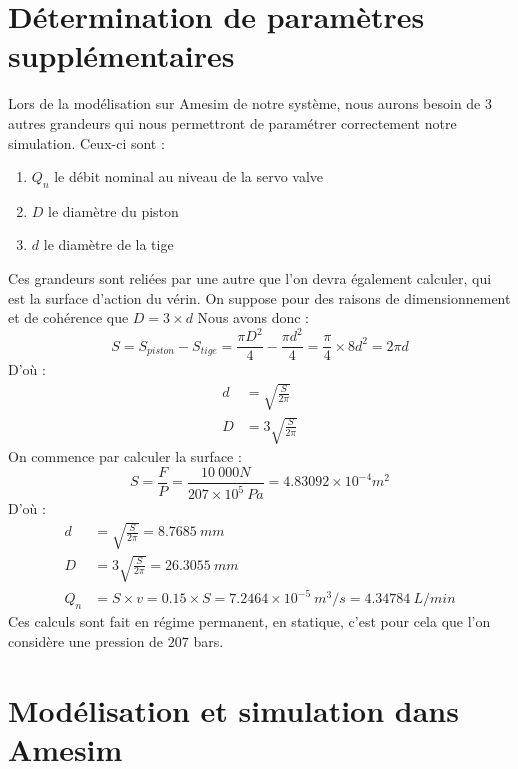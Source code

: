\documentclass[a4paper,12pt,calibri,oneside,openany]{book}
\theoremstyle{break}
\begin{document}
\section{Détermination de paramètres supplémentaires}
\qquad Lors de la modélisation sur Amesim de notre système, nous aurons besoin de $3$ autres grandeurs qui nous permettront de paramétrer correctement notre simulation. Ceux-ci sont :
\begin{enumerate}
	\item $Q_n$ le débit nominal au niveau de la servo valve
	\item $D$ le diamètre du piston
	\item $d$ le diamètre de la tige
\end{enumerate}
Ces grandeurs sont reliées par une autre que l'on devra également calculer, qui est la surface d'action du vérin. On suppose pour des raisons de dimensionnement et de cohérence que $D = 3\times d$ Nous avons donc :
\begin{equation}
	S = S_{piston} - S_{tige} = \frac{\pi D^2}{4} - \frac{\pi d^2}{4} = \frac{\pi}{4} \times 8d^2 = 2\pi d
\end{equation}
D'où : 
\begin{align}
	d &= \sqrt{\frac{S}{2\pi}}\\
	D &= 3\sqrt{\frac{S}{2\pi}}
\end{align}
On commence par calculer la surface : 
\begin{equation}
	S = \frac{F}{P} = \frac{10\ 000N}{207\times 10^5\ Pa} = 4.83092\times 10^{-4} m^2
\end{equation}
D'où : 
\begin{align}
	d &= \sqrt{\frac{S}{2\pi}} = 8.7685\ mm\\
	D &= 3\sqrt{\frac{S}{2\pi}} = 26.3055\ mm\\
	Q_n &= S\times v = 0.15\times S = 7.2464\times 10^{-5}\ m^3/s = 4.34784\ L/min
\end{align}
Ces calculs sont fait en régime permanent, en statique, c'est pour cela que l'on considère une pression de $207$ bars.
\section{Modélisation et simulation dans Amesim}
\end{document}
